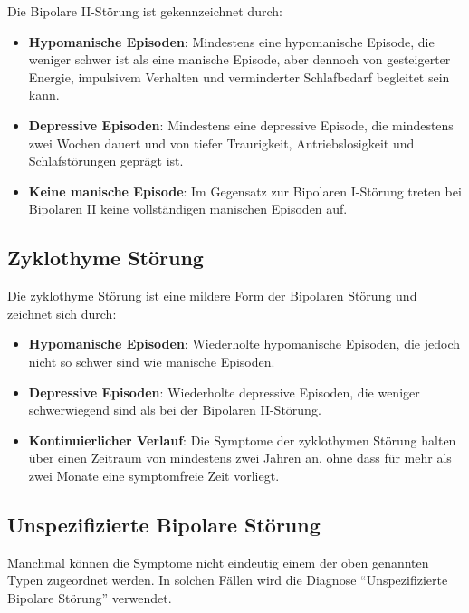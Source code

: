 Die Bipolare II-Störung ist gekennzeichnet durch:

\begin{itemize}
\item \textbf{Hypomanische Episoden}: Mindestens eine hypomanische Episode, die weniger schwer ist als eine manische Episode, aber dennoch von gesteigerter Energie, impulsivem Verhalten und verminderter Schlafbedarf begleitet sein kann.

\item \textbf{Depressive Episoden}: Mindestens eine depressive Episode, die mindestens zwei Wochen dauert und von tiefer Traurigkeit, Antriebslosigkeit und Schlafstörungen geprägt ist.

\item \textbf{Keine manische Episode}: Im Gegensatz zur Bipolaren I-Störung treten bei Bipolaren II keine vollständigen manischen Episoden auf.
\end{itemize}

\subsection{Zyklothyme Störung}

Die zyklothyme Störung ist eine mildere Form der Bipolaren Störung und zeichnet sich durch:

\begin{itemize}
\item \textbf{Hypomanische Episoden}: Wiederholte hypomanische Episoden, die jedoch nicht so schwer sind wie manische Episoden.

\item \textbf{Depressive Episoden}: Wiederholte depressive Episoden, die weniger schwerwiegend sind als bei der Bipolaren II-Störung.

\item \textbf{Kontinuierlicher Verlauf}: Die Symptome der zyklothymen Störung halten über einen Zeitraum von mindestens zwei Jahren an, ohne dass für mehr als zwei Monate eine symptomfreie Zeit vorliegt.
\end{itemize}

\subsection{Unspezifizierte Bipolare Störung}

Manchmal können die Symptome nicht eindeutig einem der oben genannten Typen zugeordnet werden. In solchen Fällen wird die Diagnose \enquote{Unspezifizierte Bipolare Störung} verwendet.

